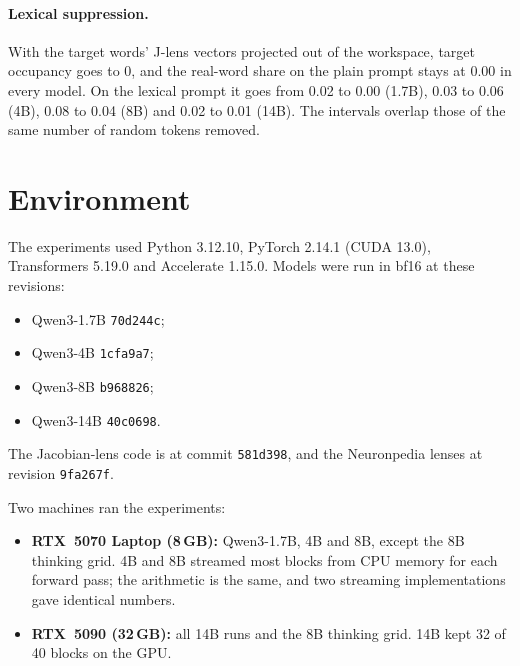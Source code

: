 \documentclass[11pt]{article}
\begin{document}
\paragraph{Lexical suppression.} With the target words' J-lens vectors projected out of the workspace, target occupancy goes to 0, and the real-word share on the plain prompt stays at 0.00 in every model. On the lexical prompt it goes from 0.02 to 0.00 (1.7B), 0.03 to 0.06 (4B), 0.08 to 0.04 (8B) and 0.02 to 0.01 (14B). The intervals overlap those of the same number of random tokens removed.

\section{Environment}\label{app:env}

The experiments used Python 3.12.10, PyTorch 2.14.1 (CUDA 13.0), Transformers 5.19.0 and Accelerate 1.15.0. Models were run in bf16 at these revisions:
\begin{itemize}
  \item Qwen3-1.7B \texttt{70d244c};
  \item Qwen3-4B \texttt{1cfa9a7};
  \item Qwen3-8B \texttt{b968826};
  \item Qwen3-14B \texttt{40c0698}.
\end{itemize}
The Jacobian-lens code is at commit \texttt{581d398}, and the Neuronpedia lenses at revision \texttt{9fa267f}.

Two machines ran the experiments:
\begin{itemize}
  \item \textbf{RTX~5070 Laptop (8\,GB):} Qwen3-1.7B, 4B and 8B, except the 8B thinking grid. 4B and 8B streamed most blocks from CPU memory for each forward pass; the arithmetic is the same, and two streaming implementations gave identical numbers.
  \item \textbf{RTX~5090 (32\,GB):} all 14B runs and the 8B thinking grid. 14B kept 32 of 40 blocks on the GPU.
\end{itemize}
\end{document}
